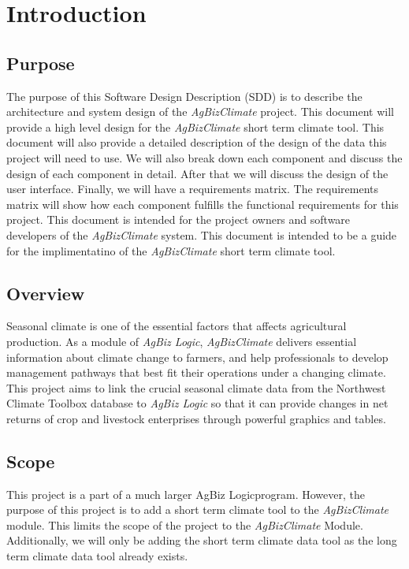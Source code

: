 \documentclass[onecolumn, draftclsnofoot,10pt, compsoc]{article}
\begin{document}
\section{Introduction}

		\subsection{Purpose}
			The purpose of this Software Design Description (SDD) is to describe the architecture and system design of the \textit{AgBizClimate} project. This document will provide a high level design for the \textit{AgBizClimate} short term climate tool. This document will also provide a detailed description of the design of the data this project will need to use. We will also break down each component and discuss the design of each component in detail. After that we will discuss the design of the user interface. Finally, we will have a requirements matrix. The requirements matrix will show how each component fulfills the functional requirements for this project.
			This document is intended for the project owners and software developers of the \textit{AgBizClimate} system. This document is intended to be a guide for the implimentatino of the \textit{AgBizClimate} short term climate tool.

		\subsection{Overview}
			Seasonal climate is one of the essential factors that affects agricultural production. As a module of \textit{AgBiz Logic}, \textit{AgBizClimate} delivers essential information about climate change to farmers, and help professionals to develop management pathways that best fit their operations under a changing climate. This project aims to link the crucial seasonal climate data from the Northwest Climate Toolbox database to \textit{AgBiz Logic} so that it can provide changes in net returns of crop and livestock enterprises through powerful graphics and tables.\\

		\subsection{Scope}
			This project is a part of a much larger AgBiz Logic\texttrademark program. However, the purpose of this project is to add a short term climate tool to the \textit{AgBizClimate} module. This limits the scope of the project to the \textit{AgBizClimate} Module. Additionally, we will only be adding the short term climate data tool as the long term climate data tool already exists.\\
\end{document}
